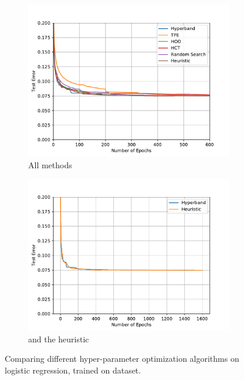 \documentclass[twoside,11pt]{article}
\begin{document}
\begin{figure}%
    \centering
    \begin{subfigure}[t]{0.3\textwidth}
    	\centering\includegraphics[width=\textwidth]{img/mnist/logistic_1.pdf}%
	\caption{All methods}
    \end{subfigure}%
    \begin{subfigure}[t]{0.3\textwidth}
    	\centering\includegraphics[width=\textwidth]{img/mnist/logistic_1_bis.pdf}%
   	\caption{\Hyperband and the heuristic}%
    \end{subfigure}
    \caption{Comparing different hyper-parameter optimization algorithms on logistic regression, trained on \MNIST dataset.}
    \label{fig:logistic}%
\end{figure}
\end{document}

